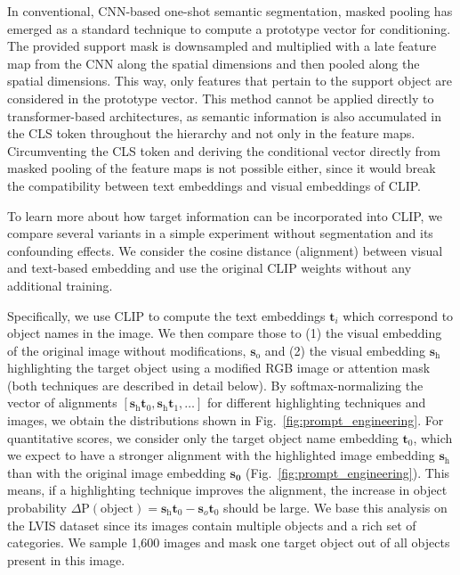 \documentclass[10pt,twocolumn,letterpaper]{article}
\begin{document}
In conventional, CNN-based one-shot semantic segmentation, masked pooling \cite{shaban17} has emerged as a standard technique to compute a prototype vector for conditioning. The provided support mask is downsampled and multiplied with a late feature map from the CNN along the spatial dimensions and then pooled along the spatial dimensions. This way, only features that pertain to the support object are considered in the prototype vector.
This method cannot be applied directly to transformer-based architectures, as semantic information is also accumulated in the CLS token throughout the hierarchy and not only in the feature maps. 
Circumventing the CLS token and deriving the conditional vector directly from masked pooling of the feature maps is not possible either, since it would break the compatibility between text embeddings and visual embeddings of CLIP.

To learn more about how target information can be incorporated into CLIP, we compare several variants in a simple experiment without segmentation and its confounding effects.
We consider the cosine distance (alignment) between visual and text-based embedding and use the original CLIP weights without any additional training.




Specifically, we use CLIP to compute the text embeddings $\mathbf{t}_i$ which correspond to object names in the image. We then compare those to (1) the visual embedding of the original image without modifications, $\mathbf{s}_{\text{o}}$ and (2) the visual embedding $\mathbf{s}_{\text{h}}$ highlighting the target object using a modified RGB image or attention mask (both techniques are described in detail below).
By softmax-normalizing the vector of alignments $[\mathbf{s}_{\text{h}} \mathbf{t}_0, \mathbf{s}_{\text{h}} \mathbf{t}_1, \dots]$ for different highlighting techniques and images, we obtain the distributions shown in Fig.~\ref{fig:prompt_engineering}.
For quantitative scores, we consider only the target object name embedding $\mathbf{t}_0$, which we expect to have a stronger alignment with the highlighted image embedding $\mathbf{s}_{\text{h}}$ than with the original image embedding $\mathbf{s_0}$ (Fig.~\ref{fig:prompt_engineering}). This means, if a highlighting technique improves the alignment, the increase in object probability $\Delta \text{P}(\text{object}) = \mathbf{s}_{\text{h}} \mathbf{t}_0  - \mathbf{s}_{o} \mathbf{t}_0 $ should be large.
We base this analysis on the LVIS dataset \cite{gupta19lvis} since its images contain multiple objects and a rich set of categories. We sample 1,600 images and mask one target object out of all objects present in this image. 
\end{document}
